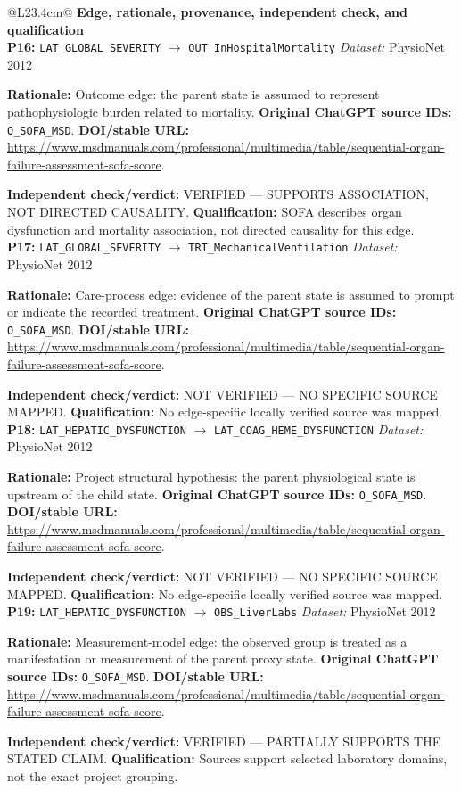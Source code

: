 \begin{tabular}{@{}L{23.4cm}@{}}
\toprule
\textbf{Edge, rationale, provenance, independent check, and qualification}\\
\midrule
\textbf{P16:} \nolinkurl{LAT_GLOBAL_SEVERITY} $\rightarrow$ \nolinkurl{OUT_InHospitalMortality} \hfill \textit{Dataset:} PhysioNet 2012\par\textbf{Rationale:} Outcome edge: the parent state is assumed to represent pathophysiologic burden related to mortality. \textbf{Original ChatGPT source IDs:} \nolinkurl{O_SOFA_MSD}. \textbf{DOI/stable URL:} \url{https://www.msdmanuals.com/professional/multimedia/table/sequential-organ-failure-assessment-sofa-score}.\par\textbf{Independent check/verdict:} VERIFIED --- SUPPORTS ASSOCIATION, NOT DIRECTED CAUSALITY. \textbf{Qualification:} SOFA describes organ dysfunction and mortality association, not directed causality for this edge. \\
\addlinespace[2pt]
\midrule
\textbf{P17:} \nolinkurl{LAT_GLOBAL_SEVERITY} $\rightarrow$ \nolinkurl{TRT_MechanicalVentilation} \hfill \textit{Dataset:} PhysioNet 2012\par\textbf{Rationale:} Care-process edge: evidence of the parent state is assumed to prompt or indicate the recorded treatment. \textbf{Original ChatGPT source IDs:} \nolinkurl{O_SOFA_MSD}. \textbf{DOI/stable URL:} \url{https://www.msdmanuals.com/professional/multimedia/table/sequential-organ-failure-assessment-sofa-score}.\par\textbf{Independent check/verdict:} NOT VERIFIED --- NO SPECIFIC SOURCE MAPPED. \textbf{Qualification:} No edge-specific locally verified source was mapped. \\
\addlinespace[2pt]
\midrule
\textbf{P18:} \nolinkurl{LAT_HEPATIC_DYSFUNCTION} $\rightarrow$ \nolinkurl{LAT_COAG_HEME_DYSFUNCTION} \hfill \textit{Dataset:} PhysioNet 2012\par\textbf{Rationale:} Project structural hypothesis: the parent physiological state is upstream of the child state. \textbf{Original ChatGPT source IDs:} \nolinkurl{O_SOFA_MSD}. \textbf{DOI/stable URL:} \url{https://www.msdmanuals.com/professional/multimedia/table/sequential-organ-failure-assessment-sofa-score}.\par\textbf{Independent check/verdict:} NOT VERIFIED --- NO SPECIFIC SOURCE MAPPED. \textbf{Qualification:} No edge-specific locally verified source was mapped. \\
\addlinespace[2pt]
\midrule
\textbf{P19:} \nolinkurl{LAT_HEPATIC_DYSFUNCTION} $\rightarrow$ \nolinkurl{OBS_LiverLabs} \hfill \textit{Dataset:} PhysioNet 2012\par\textbf{Rationale:} Measurement-model edge: the observed group is treated as a manifestation or measurement of the parent proxy state. \textbf{Original ChatGPT source IDs:} \nolinkurl{O_SOFA_MSD}. \textbf{DOI/stable URL:} \url{https://www.msdmanuals.com/professional/multimedia/table/sequential-organ-failure-assessment-sofa-score}.\par\textbf{Independent check/verdict:} VERIFIED --- PARTIALLY SUPPORTS THE STATED CLAIM. \textbf{Qualification:} Sources support selected laboratory domains, not the exact project grouping. \\

\end{tabular}
